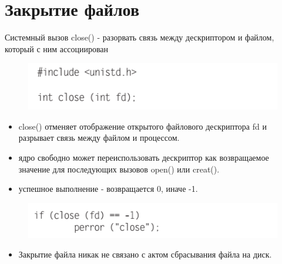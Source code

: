 \documentclass{beamer}
\begin{document}
\section{Закрытие файлов}
\begin{frame}
Системный вызов close() - разорвать связь между дескриптором и файлом, который с ним ассоциирован
\begin{figure}[h]
\centering
\includegraphics[scale=0.6]{images/lec06-pic17.png}
\end{figure}
\begin{itemize}
\item close() отменяет отображение открытого файлового дескриптора fd и разрывает связь между файлом и процессом. 
\item ядро свободно может переиспользовать дескриптор как возвращаемое значение для последующих вызовов open() или creat(). 
\item успешное выполнение - возвращается 0, иначе -1. 
\end{itemize}
\begin{figure}[h]
\centering
\includegraphics[scale=0.6]{images/lec06-pic18.png}
\end{figure}
\begin{itemize}
\item Закрытие файла никак не связано с актом сбрасывания файла на диск. 
\end{itemize}
\end{frame}
\end{document}
